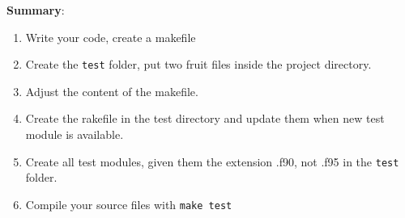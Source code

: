\begin{enumerate}







\end{enumerate}

{\bf Summary}:
\begin{enumerate}
\item Write your code, create a makefile
\item Create the \verb!test! folder, put two fruit files inside the
  project directory.
\item Adjust the content of the makefile.
\item Create the rakefile in the test directory and update them when
  new test module is available.
\item Create all test modules, given them the extension .f90, not .f95
  in the \verb!test! folder.
\item Compile your source files with \verb!make test!
\end{enumerate}


